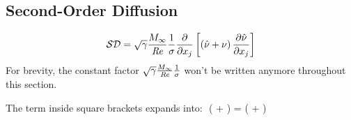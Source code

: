 \documentclass{SelimArticle}
\begin{document}

\subsection{Second-Order Diffusion}
$$
    \mathcal{SD} =  \sqrt{\gamma}\frac{M_\infty}{\mathit{Re}}  \frac{1}{\sigma} \frac{\partial }{\partial x_j} \left[
            \left( \hat{\nu} + \nu \right) \frac{\partial \hat{\nu}}{\partial x_j} 
    \right]
$$
For brevity, the constant factor $ \sqrt{\gamma}\frac{M_\infty}{\mathit{Re}}  \frac{1}{\sigma}$ won't be written anymore throughout
this section.

The term inside square brackets expands into:
$$
    \left( \sa + \nu \right) = \left( \sa + \nu \right)\

\end{document}
